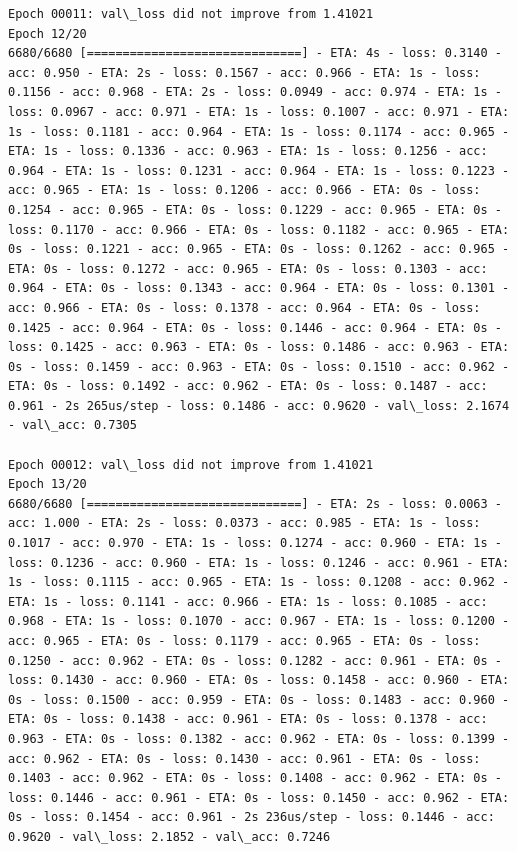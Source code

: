 \documentclass[11pt]{article}
\begin{document}
\begin{Verbatim}[commandchars=\\\{\}]
Epoch 00011: val\_loss did not improve from 1.41021
Epoch 12/20
6680/6680 [==============================] - ETA: 4s - loss: 0.3140 - acc: 0.950 - ETA: 2s - loss: 0.1567 - acc: 0.966 - ETA: 1s - loss: 0.1156 - acc: 0.968 - ETA: 2s - loss: 0.0949 - acc: 0.974 - ETA: 1s - loss: 0.0967 - acc: 0.971 - ETA: 1s - loss: 0.1007 - acc: 0.971 - ETA: 1s - loss: 0.1181 - acc: 0.964 - ETA: 1s - loss: 0.1174 - acc: 0.965 - ETA: 1s - loss: 0.1336 - acc: 0.963 - ETA: 1s - loss: 0.1256 - acc: 0.964 - ETA: 1s - loss: 0.1231 - acc: 0.964 - ETA: 1s - loss: 0.1223 - acc: 0.965 - ETA: 1s - loss: 0.1206 - acc: 0.966 - ETA: 0s - loss: 0.1254 - acc: 0.965 - ETA: 0s - loss: 0.1229 - acc: 0.965 - ETA: 0s - loss: 0.1170 - acc: 0.966 - ETA: 0s - loss: 0.1182 - acc: 0.965 - ETA: 0s - loss: 0.1221 - acc: 0.965 - ETA: 0s - loss: 0.1262 - acc: 0.965 - ETA: 0s - loss: 0.1272 - acc: 0.965 - ETA: 0s - loss: 0.1303 - acc: 0.964 - ETA: 0s - loss: 0.1343 - acc: 0.964 - ETA: 0s - loss: 0.1301 - acc: 0.966 - ETA: 0s - loss: 0.1378 - acc: 0.964 - ETA: 0s - loss: 0.1425 - acc: 0.964 - ETA: 0s - loss: 0.1446 - acc: 0.964 - ETA: 0s - loss: 0.1425 - acc: 0.963 - ETA: 0s - loss: 0.1486 - acc: 0.963 - ETA: 0s - loss: 0.1459 - acc: 0.963 - ETA: 0s - loss: 0.1510 - acc: 0.962 - ETA: 0s - loss: 0.1492 - acc: 0.962 - ETA: 0s - loss: 0.1487 - acc: 0.961 - 2s 265us/step - loss: 0.1486 - acc: 0.9620 - val\_loss: 2.1674 - val\_acc: 0.7305

Epoch 00012: val\_loss did not improve from 1.41021
Epoch 13/20
6680/6680 [==============================] - ETA: 2s - loss: 0.0063 - acc: 1.000 - ETA: 2s - loss: 0.0373 - acc: 0.985 - ETA: 1s - loss: 0.1017 - acc: 0.970 - ETA: 1s - loss: 0.1274 - acc: 0.960 - ETA: 1s - loss: 0.1236 - acc: 0.960 - ETA: 1s - loss: 0.1246 - acc: 0.961 - ETA: 1s - loss: 0.1115 - acc: 0.965 - ETA: 1s - loss: 0.1208 - acc: 0.962 - ETA: 1s - loss: 0.1141 - acc: 0.966 - ETA: 1s - loss: 0.1085 - acc: 0.968 - ETA: 1s - loss: 0.1070 - acc: 0.967 - ETA: 1s - loss: 0.1200 - acc: 0.965 - ETA: 0s - loss: 0.1179 - acc: 0.965 - ETA: 0s - loss: 0.1250 - acc: 0.962 - ETA: 0s - loss: 0.1282 - acc: 0.961 - ETA: 0s - loss: 0.1430 - acc: 0.960 - ETA: 0s - loss: 0.1458 - acc: 0.960 - ETA: 0s - loss: 0.1500 - acc: 0.959 - ETA: 0s - loss: 0.1483 - acc: 0.960 - ETA: 0s - loss: 0.1438 - acc: 0.961 - ETA: 0s - loss: 0.1378 - acc: 0.963 - ETA: 0s - loss: 0.1382 - acc: 0.962 - ETA: 0s - loss: 0.1399 - acc: 0.962 - ETA: 0s - loss: 0.1430 - acc: 0.961 - ETA: 0s - loss: 0.1403 - acc: 0.962 - ETA: 0s - loss: 0.1408 - acc: 0.962 - ETA: 0s - loss: 0.1446 - acc: 0.961 - ETA: 0s - loss: 0.1450 - acc: 0.962 - ETA: 0s - loss: 0.1454 - acc: 0.961 - 2s 236us/step - loss: 0.1446 - acc: 0.9620 - val\_loss: 2.1852 - val\_acc: 0.7246


\end{Verbatim}
\end{document}
